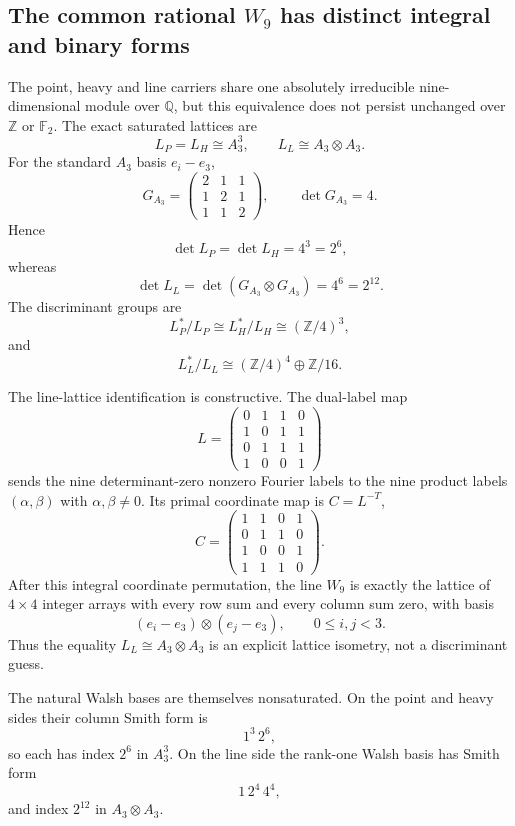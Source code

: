 \subsection{The common rational $W_9$ has distinct integral and binary forms}
\label{sec:pass5824-5831-integral-w9}

The point, heavy and line carriers share one absolutely irreducible
nine-dimensional module over $\mathbb Q$, but this equivalence does not persist
unchanged over $\mathbb Z$ or $\mathbb F_2$.  The exact saturated lattices are
\[
 \boxed{L_P=L_H\cong A_3^3},
 \qquad
 \boxed{L_L\cong A_3\otimes A_3}.
\]
For the standard $A_3$ basis $e_i-e_3$,
\[
 G_{A_3}=\begin{pmatrix}2&1&1\\1&2&1\\1&1&2\end{pmatrix},
 \qquad \det G_{A_3}=4.
\]
Hence
\[
 \boxed{\det L_P=\det L_H=4^3=2^6},
\]
whereas
\[
 \boxed{\det L_L=\det(G_{A_3}\otimes G_{A_3})=4^6=2^{12}}.
\]
The discriminant groups are
\[
 \boxed{L_P^*/L_P\cong L_H^*/L_H\cong(\mathbb Z/4)^3},
\]
and
\[
 \boxed{L_L^*/L_L\cong(\mathbb Z/4)^4\oplus\mathbb Z/16}.
\]

The line-lattice identification is constructive.  The dual-label map
\[
L=\begin{pmatrix}
0&1&1&0\\1&0&1&1\\0&1&1&1\\1&0&0&1
\end{pmatrix}
\]
sends the nine determinant-zero nonzero Fourier labels to the nine product
labels $(\alpha,\beta)$ with $\alpha,\beta\ne0$.  Its primal coordinate map is
$C=L^{-T}$,
\[
C=\begin{pmatrix}
1&1&0&1\\0&1&1&0\\1&0&0&1\\1&1&1&0
\end{pmatrix}.
\]
After this integral coordinate permutation, the line $W_9$ is exactly the
lattice of $4\times4$ integer arrays with every row sum and every column sum
zero, with basis
\[
 (e_i-e_3)\otimes(e_j-e_3),\qquad0\le i,j<3.
\]
Thus the equality $L_L\cong A_3\otimes A_3$ is an explicit lattice isometry,
not a discriminant guess.

The natural Walsh bases are themselves nonsaturated.  On the point and heavy
sides their column Smith form is
\[
 \boxed{1^3\,2^6},
\]
so each has index $2^6$ in $A_3^3$.  On the line side the rank-one Walsh
basis has Smith form
\[
 \boxed{1\,2^4\,4^4},
\]
and index $2^{12}$ in $A_3\otimes A_3$.

